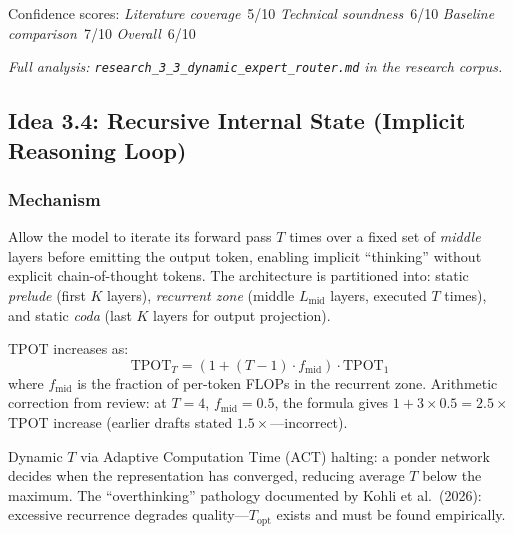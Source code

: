 \documentclass[11pt]{article}
\begin{document}
\noindent
Confidence scores:
\emph{Literature coverage}~5/10 \quad
\emph{Technical soundness}~6/10 \quad
\emph{Baseline comparison}~7/10 \quad
\emph{Overall}~6/10

\par\noindent\textit{Full analysis: \texttt{research\_3\_3\_dynamic\_expert\_router.md} in the research corpus.}

\subsection{Idea 3.4: Recursive Internal State (Implicit Reasoning Loop)}
\label{subsec:idea-3-4}

\subsubsection*{Mechanism}
Allow the model to iterate its forward pass $T$ times over a fixed set of \emph{middle} layers before emitting the output token, enabling implicit ``thinking'' without explicit chain-of-thought tokens.
The architecture is partitioned into: static \emph{prelude} (first $K$ layers), \emph{recurrent zone} (middle $L_\text{mid}$ layers, executed $T$ times), and static \emph{coda} (last $K$ layers for output projection).

TPOT increases as:
\[
  \text{TPOT}_T = \left(1 + (T-1) \cdot f_\text{mid}\right) \cdot \text{TPOT}_1
\]
where $f_\text{mid}$ is the fraction of per-token FLOPs in the recurrent zone.
Arithmetic correction from review: at $T=4$, $f_\text{mid}=0.5$, the formula gives $1 + 3 \times 0.5 = 2.5\times$ TPOT increase (earlier drafts stated $1.5\times$---incorrect).

Dynamic $T$ via Adaptive Computation Time (ACT) \cite{Graves2016} halting: a ponder network decides when the representation has converged, reducing average $T$ below the maximum.
The ``overthinking'' pathology documented by Kohli et al.\ (2026): excessive recurrence degrades quality---$T_\text{opt}$ exists and must be found empirically.
\end{document}
